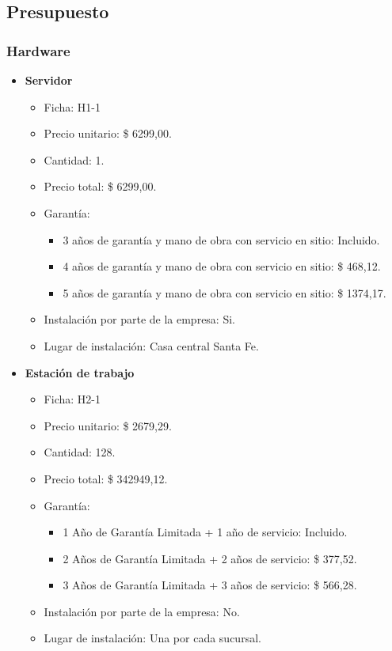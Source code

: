 \subsection{Presupuesto}

\subsubsection{Hardware}
\begin{itemize}
  \item \textbf{Servidor}
    \begin{itemize}
      \item Ficha: H1-1
      \item Precio unitario: \$ 6299,00.
      \item Cantidad: 1.
      \item Precio total: \$ 6299,00.
      \item Garantía:
        \begin{itemize}
          \item 3 años de garantía y mano de obra con servicio en sitio: Incluido.
          \item 4 años de garantía y mano de obra con servicio en sitio: \$  468,12.
          \item 5 años de garantía y mano de obra con servicio en sitio: \$ 1374,17.
        \end{itemize}
      \item Instalación por parte de la empresa: Si.
      \item Lugar de instalación: Casa central Santa Fe.
    \end{itemize}
  
  \item \textbf{Estación de trabajo}
    \begin{itemize}
      \item Ficha: H2-1
      \item Precio unitario: \$ 2679,29.
      \item Cantidad: 128.
      \item Precio total: \$ 342949,12.
      
      \item Garantía:
        \begin{itemize}
          \item 1 Año de Garantía Limitada + 1 año de servicio: Incluido.
          \item 2 Años de Garantía Limitada + 2 años de servicio: \$ 377,52.
          \item 3 Años de Garantía Limitada + 3 años de servicio: \$ 566,28.
        \end{itemize}
      \item Instalación por parte de la empresa: No.
      \item Lugar de instalación: Una por cada sucursal.
    \end{itemize}


\end{itemize}
